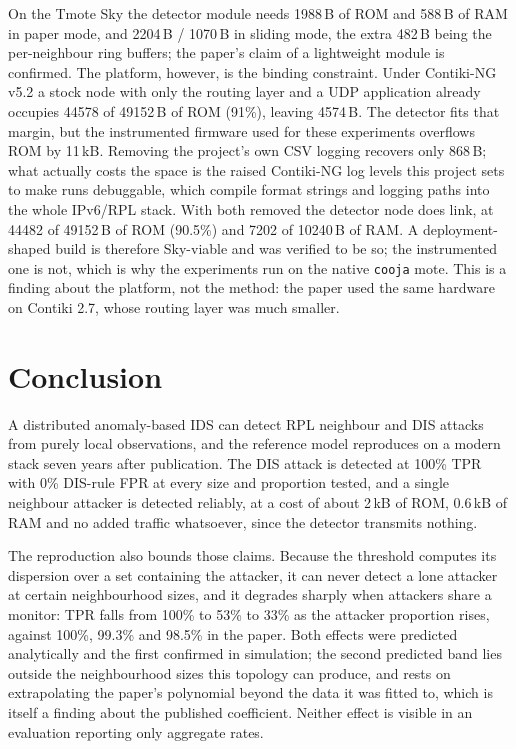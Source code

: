\documentclass[11pt, a4paper]{article}
\begin{document}
On the Tmote Sky the detector module needs 1988\,B of ROM and 588\,B of RAM in paper mode, and 2204\,B / 1070\,B in sliding mode, the extra 482\,B being the per-neighbour ring buffers; the paper's claim of a lightweight module is confirmed. The platform, however, is the binding constraint. Under Contiki-NG v5.2 a stock node with only the routing layer and a UDP application already occupies 44578 of 49152\,B of ROM (91\%), leaving 4574\,B. The detector fits that margin, but the instrumented firmware used for these experiments overflows ROM by 11\,kB. Removing the project's own CSV logging recovers only 868\,B; what actually costs the space is the raised Contiki-NG log levels this project sets to make runs debuggable, which compile format strings and logging paths into the whole IPv6/RPL stack. With both removed the detector node does link, at 44482 of 49152\,B of ROM (90.5\%) and 7202 of 10240\,B of RAM. A deployment-shaped build is therefore Sky-viable and was verified to be so; the instrumented one is not, which is why the experiments run on the native \texttt{cooja} mote. This is a finding about the platform, not the method: the paper used the same hardware on Contiki 2.7, whose routing layer was much smaller.

\section{Conclusion}

A distributed anomaly-based IDS can detect RPL neighbour and DIS attacks from purely local observations, and the reference model reproduces on a modern stack seven years after publication. The DIS attack is detected at 100\% TPR with 0\% DIS-rule FPR at every size and proportion tested, and a single neighbour attacker is detected reliably, at a cost of about 2\,kB of ROM, 0.6\,kB of RAM and no added traffic whatsoever, since the detector transmits nothing.

The reproduction also bounds those claims. Because the threshold computes its dispersion over a set containing the attacker, it can never detect a lone attacker at certain neighbourhood sizes, and it degrades sharply when attackers share a monitor: TPR falls from 100\% to 53\% to 33\% as the attacker proportion rises, against 100\%, 99.3\% and 98.5\% in the paper. Both effects were predicted analytically and the first confirmed in simulation; the second predicted band lies outside the neighbourhood sizes this topology can produce, and rests on extrapolating the paper's polynomial beyond the data it was fitted to, which is itself a finding about the published coefficient. Neither effect is visible in an evaluation reporting only aggregate rates.
\end{document}
